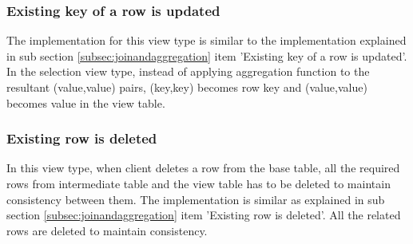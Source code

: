 \documentclass[11pt,a4paper,bibtotoc,idxtotoc,headsepline,footsepline,footexclude,BCOR12mm,DIV13]{scrbook}
\begin{document}
\subsubsection{Existing key of a row is updated}

The implementation for this view type is similar to the implementation explained in sub section \ref{subsec:joinandaggregation} item 'Existing key of a row is updated'. In the selection view type, instead of applying aggregation function to the resultant (value,value) pairs, (key,key) becomes row key and (value,value) becomes value in the view table.


\subsubsection{Existing row is deleted}

In this view type, when client deletes a row from the base table, all the required rows from intermediate table and the view table has to be deleted to maintain consistency between them. The implementation is similar as explained in sub section \ref{subsec:joinandaggregation} item 'Existing row is deleted'. All the related rows are deleted to maintain consistency.

\end{document}
